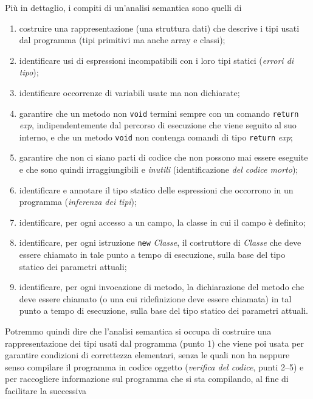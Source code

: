 Pi\`u in dettaglio, i compiti di un'analisi semantica sono quelli di
%
\begin{enumerate}
\item costruire una rappresentazione (una struttura dati) che descrive
      i tipi usati dal programma (tipi primitivi ma anche array e classi);
\item identificare usi di espressioni incompatibili con i loro tipi statici
      (\emph{errori di tipo});
\item identificare occorrenze di variabili usate ma non dichiarate;
\item garantire che un metodo non \texttt{void} termini sempre con
      un comando \texttt{return} \textit{exp},
      indipendentemente dal percorso di
      esecuzione che viene seguito al suo interno, e che un metodo
      \texttt{void} non contenga comandi di tipo \texttt{return} \textit{exp};
\item garantire che non ci siano parti di codice che non possono mai
      essere eseguite e che sono quindi irraggiungibili e \emph{inutili}
      (identificazione \emph{del codice morto});
\item identificare e annotare il tipo statico delle espressioni che occorrono
      in un programma (\emph{inferenza dei tipi});
\item identificare, per ogni accesso a un campo, la classe in cui il campo
      \`e definito;
\item identificare, per ogni istruzione \texttt{new} \textit{Classe},
      il costruttore di \textit{Classe}
      che deve essere chiamato in tale punto a tempo di esecuzione,
      sulla base del tipo statico dei parametri attuali;
\item identificare, per ogni invocazione di metodo,
      la dichiarazione del metodo
      che deve essere chiamato (o una cui ridefinizione deve essere chiamata)
      in tal punto a tempo di esecuzione,
      sulla base del tipo statico dei parametri attuali.
\end{enumerate}
%
Potremmo quindi dire che l'analisi semantica si occupa di
costruire una rappresentazione dei tipi usati dal programma (punto 1)
che viene poi usata per garantire condizioni
di correttezza elementari, senza le quali non ha neppure senso compilare
il programma in codice oggetto (\emph{verifica del codice},
punti 2--5) e per raccogliere informazione
sul programma che si sta compilando, al fine di facilitare la successiva
